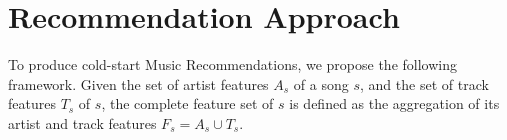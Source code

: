 

\section{Recommendation Approach}
\label{sec:cold-rec:approach}



To produce cold-start Music Recommendations, we propose the following framework.
Given the set of artist features $A_{s}$ of a song $s$, and the set of track features $T_{s}$ of $s$, the complete feature set of $s$ is defined as the aggregation of its artist and track features $F_{s} = A_{s} \cup T_{s}$.

